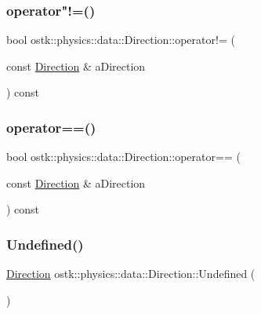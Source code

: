 \subsubsection{\texorpdfstring{operator"!=()}{operator!=()}}
{\footnotesize\ttfamily bool ostk\+::physics\+::data\+::\+Direction\+::operator!= (\begin{DoxyParamCaption}\item[{const \hyperlink{classostk_1_1physics_1_1data_1_1_direction}{Direction} \&}]{a\+Direction }\end{DoxyParamCaption}) const}

\mbox{\label{classostk_1_1physics_1_1data_1_1_direction_aa1d684ca3528113e412f9d8b5d51b49f}} 
\subsubsection{\texorpdfstring{operator==()}{operator==()}}
{\footnotesize\ttfamily bool ostk\+::physics\+::data\+::\+Direction\+::operator== (\begin{DoxyParamCaption}\item[{const \hyperlink{classostk_1_1physics_1_1data_1_1_direction}{Direction} \&}]{a\+Direction }\end{DoxyParamCaption}) const}

\mbox{\label{classostk_1_1physics_1_1data_1_1_direction_a47b0ba9fb3f592e2fd1fba846af6483c}} 
\subsubsection{\texorpdfstring{Undefined()}{Undefined()}}
{\footnotesize\ttfamily \hyperlink{classostk_1_1physics_1_1data_1_1_direction}{Direction} ostk\+::physics\+::data\+::\+Direction\+::\+Undefined (\begin{DoxyParamCaption}{ }\end{DoxyParamCaption})\hspace{0.3cm}{\ttfamily [static]}}



